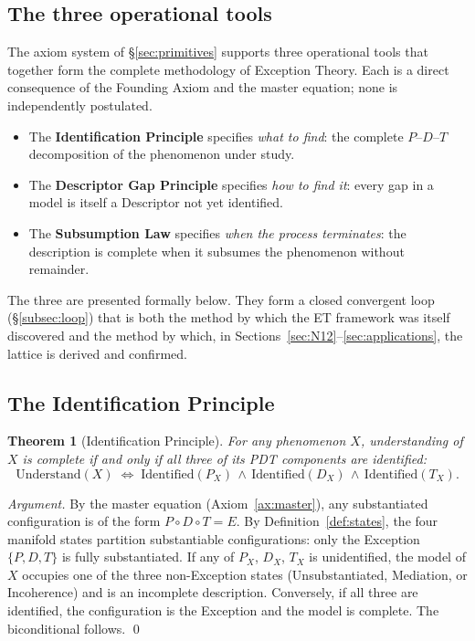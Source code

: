\documentclass[11pt,a4paper]{article}
\newtheorem{theorem}{Theorem}[section]
\theoremstyle{definition}
\theoremstyle{remark}
\begin{document}
\subsection{The three operational tools}\label{subsec:three-tools}

The axiom system of \S\ref{sec:primitives} supports three operational tools that together form the complete methodology of Exception Theory. Each is a direct consequence of the Founding Axiom and the master equation; none is independently postulated.

\begin{itemize}[leftmargin=*]
\item The \textbf{Identification Principle} specifies \emph{what to find}: the complete $P$--$D$--$T$ decomposition of the phenomenon under study.
\item The \textbf{Descriptor Gap Principle} specifies \emph{how to find it}: every gap in a model is itself a Descriptor not yet identified.
\item The \textbf{Subsumption Law} specifies \emph{when the process terminates}: the description is complete when it subsumes the phenomenon without remainder.
\end{itemize}

The three are presented formally below. They form a closed convergent loop (\S\ref{subsec:loop}) that is both the method by which the ET framework was itself discovered and the method by which, in Sections~\ref{sec:N12}--\ref{sec:applications}, the lattice is derived and confirmed.

\subsection{The Identification Principle}\label{subsec:identification}

\begin{theorem}[Identification Principle]\label{thm:identification}
For any phenomenon $X$, understanding of $X$ is complete if and only if all three of its PDT components are identified:
\[
\boxed{\;\mathrm{Understand}(X) \;\iff\; \mathrm{Identified}(P_{X}) \,\land\, \mathrm{Identified}(D_{X}) \,\land\, \mathrm{Identified}(T_{X}).\;}
\]
\end{theorem}

\begin{proof}[Argument]
By the master equation (Axiom~\ref{ax:master}), any substantiated configuration is of the form $P\circ D\circ T = E$. By Definition~\ref{def:states}, the four manifold states partition substantiable configurations: only the Exception $\{P,D,T\}$ is fully substantiated. If any of $P_{X}$, $D_{X}$, $T_{X}$ is unidentified, the model of $X$ occupies one of the three non-Exception states (Unsubstantiated, Mediation, or Incoherence) and is an incomplete description. Conversely, if all three are identified, the configuration is the Exception and the model is complete. The biconditional follows. \qed
\end{proof}
\end{document}
